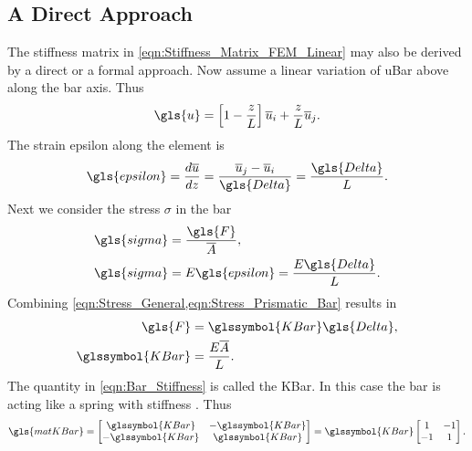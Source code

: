 \subsection{A Direct Approach}
The stiffness matrix in \cref{eqn:Stiffness_Matrix_FEM_Linear} may also be derived by a direct or a formal approach.
Now assume a linear variation of \gls{uBar} above along the bar axis. Thus
\begin{equation}	\label{eqn:Disp_Direct}
	\gls{u} = \left[ 1 - \frac{z}{L} \right] \overline{u}_i + \frac{z}{L} \overline{u}_j.
\end{equation}
The strain \gls{epsilon} along the element is
\begin{equation}	\label{eqn:Strain_Prismatic_Bar_1}
	\gls{epsilon} = \frac{ d \overline{u} }{ dz } = \frac{ \overline{u}_j - \overline{u}_i }{ \gls{Delta} } =
	\frac{ \gls{Delta} }{ L }.
\end{equation}
Next we consider the stress $\sigma$ in the bar
\begin{subequations}
	\begin{align}
		\gls{sigma} &= \frac{ \gls{F} }{ \overline{A} },	\label{eqn:Stress_General}	\\
		\gls{sigma} &= E \gls{epsilon} = \frac{ E \gls{Delta} }{ L }.	\label{eqn:Stress_Prismatic_Bar}
	\end{align}
\end{subequations}
Combining \cref{eqn:Stress_General,eqn:Stress_Prismatic_Bar} results in
\begin{subequations}
	\begin{align}
		\gls{F} &= \glssymbol{KBar} \gls{Delta},	\label{eqn:Bar_Force}	\\
		\glssymbol{KBar} &= \frac{E \overline{A}}{ L }.	\label{eqn:Bar_Stiffness}
	\end{align}
\end{subequations}
The quantity  in \cref{eqn:Bar_Stiffness} is called the \gls{KBar}. In this case the bar is acting like a spring
with stiffness . Thus
\begin{equation}	\label{eqn:Stiffness_Matrix_Direct}
	\gls{matKBar} =
	\begin{bmatrix}
		\glssymbol{KBar}	&		-\glssymbol{KBar}	\\
		-\glssymbol{KBar}	&		 \glssymbol{KBar}
	\end{bmatrix} = \glssymbol{KBar}
	\begin{bmatrix}
		1		&		-1	\\
		-1	&		 1
	\end{bmatrix}.
\end{equation}
